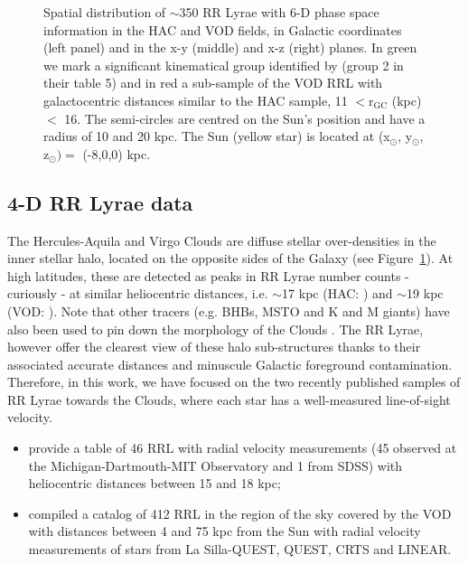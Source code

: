 \documentclass[fleqn,usenatbib]{mnras}
\begin{document}
\begin{figure}
	\vspace{-0.55cm}
    \caption{Spatial distribution of $\sim$350 RR Lyrae with 6-D phase
      space information in the HAC and VOD fields, in Galactic
      coordinates (left panel) and in the x-y (middle) and x-z (right)
      planes. In green we mark a significant kinematical group
      identified by \citet{Vivas2016} (group 2 in their table 5) and
      in red a sub-sample of the VOD RRL with galactocentric distances
      similar to the HAC sample, 11 $<\mathrm{r_{GC}}$ (kpc)$<$
      16. The semi-circles are centred on the Sun's position and have
      a radius of 10 and 20 kpc. The Sun (yellow star) is located at
      (x$_{\odot}$, y$_{\odot}$, z$_{\odot})= $ (-8,0,0) kpc.}
    \label{fig:lb}
\end{figure}
%
\subsection{4-D RR Lyrae data}
%
The Hercules-Aquila and Virgo Clouds are diffuse stellar
over-densities in the inner stellar halo, located on the opposite
sides of the Galaxy (see Figure~\ref{fig:lb}). At high latitudes,
these are detected as peaks in RR Lyrae number counts - curiously - at
similar heliocentric distances, i.e. $\sim$17 kpc (HAC:
\citealt{Wa09,Simion2014}) and $\sim$19 kpc (VOD: \citealt{Vivas2006,
  Duffau2014, Vivas2016}). Note that other tracers (e.g. BHBs, MSTO
and K and M giants) have also been used to pin down the morphology of
the Clouds \citep[see
  e.g.][]{Be07,Juric2008,Sharma2010,Bonaca2012,Conroy2018}. The RR
Lyrae, however offer the clearest view of these halo sub-structures
thanks to their associated accurate distances and minuscule Galactic
foreground contamination. Therefore, in this work, we have focused on
the two recently published samples of RR Lyrae towards the Clouds,
where each star has a well-measured line-of-sight velocity.
%
\begin{itemize}
\item \citet{Simion2018} provide a table of 46 RRL with radial
  velocity measurements (45 observed at the Michigan-Dartmouth-MIT
  Observatory and 1 from SDSS) with heliocentric distances between 15
  and 18 kpc;
\item \cite{Vivas2016} compiled a catalog of 412 RRL in the region of
  the sky covered by the VOD with distances between 4 and 75 kpc from
  the Sun with radial velocity measurements of stars from La
  Silla-QUEST, QUEST, CRTS and LINEAR.
\end{itemize}
%
%
\end{document}
